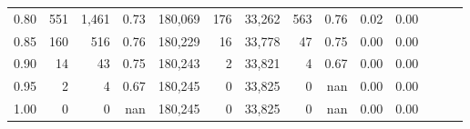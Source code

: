 \begin{tabular}{rrrrrrrrrrrrrr}
0.80 &     551 &  1,461 &  0.73 &  180,069 &      176 &  33,262 &     563 &  0.76 &  0.02 &      0.00 \\
0.85 &     160 &    516 &  0.76 &  180,229 &       16 &  33,778 &      47 &  0.75 &  0.00 &      0.00 \\
0.90 &      14 &     43 &  0.75 &  180,243 &        2 &  33,821 &       4 &  0.67 &  0.00 &      0.00 \\
0.95 &       2 &      4 &  0.67 &  180,245 &        0 &  33,825 &       0 &   nan &  0.00 &      0.00 \\
1.00 &       0 &      0 &   nan &  180,245 &        0 &  33,825 &       0 &   nan &  0.00 &      0.00 \\
\bottomrule
\end{tabular}
